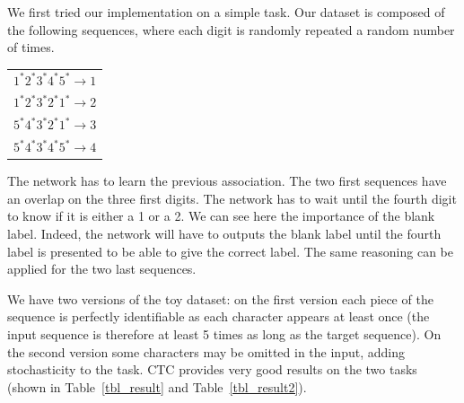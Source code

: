 \documentclass[11pt,a4paper]{article}
\begin{document}
We first tried our implementation on a simple task. Our dataset is composed of the following sequences, where each digit is randomly repeated a random number of times.

\begin{center}
\begin{tabular}{c}
    $1^*2^*3^*4^*5^* \to 1$  \\
    $1^*2^*3^*2^*1^* \to 2$  \\
    $5^*4^*3^*2^*1^* \to 3$  \\
    $5^*4^*3^*4^*5^* \to 4$  \\
\end{tabular}
\end{center}

The network has to learn the previous association. The two first sequences have an overlap on the three first digits. The network has to wait until the fourth digit to know if it is either a 1 or a 2. We can see here the importance of the blank label. Indeed, the network will have to outputs the blank label until the fourth label is presented to be able to give the correct label. The same reasoning can be applied for the two last sequences.

We have two versions of the toy dataset: on the first version each piece of the sequence is perfectly identifiable as each character appears at least once (the input sequence is therefore at least 5 times as long as the target sequence). On the second version some characters may be omitted in the input, adding stochasticity to the task. CTC provides very good results on the two tasks (shown in Table~\ref{tbl_result} and Table~\ref{tbl_result2}).
\end{document}
